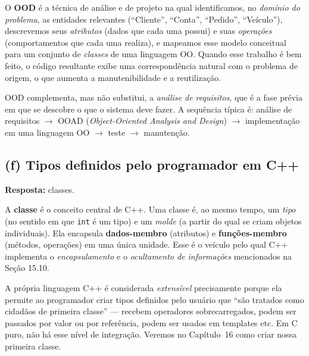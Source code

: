 \documentclass[11pt,a4paper]{article}
\begin{document}
O \textbf{OOD} \'e a t\'ecnica de an\'alise e de projeto na qual identificamos, no \emph{dom\'inio do problema}, as entidades relevantes (``Cliente'', ``Conta'', ``Pedido'', ``Ve\'iculo''), descrevemos seus \emph{atributos} (dados que cada uma possui) e suas \emph{opera\c{c}\~oes} (comportamentos que cada uma realiza), e mapeamos esse modelo conceitual para um conjunto de \emph{classes} de uma linguagem OO. Quando esse trabalho \'e bem feito, o c\'odigo resultante exibe uma correspond\^encia natural com o problema de origem, o que aumenta a manutenibilidade e a reutiliza\c{c}\~ao.

\begin{obseng}
OOD complementa, mas n\~ao substitui, a \emph{an\'alise de requisitos}, que \'e a fase pr\'evia em que se descobre o que o sistema deve fazer. A sequ\^encia t\'ipica \'e: an\'alise de requisitos $\rightarrow$ OOAD (\emph{Object-Oriented Analysis and Design}) $\rightarrow$ implementa\c{c}\~ao em uma linguagem OO $\rightarrow$ teste $\rightarrow$ manuten\c{c}\~ao.
\end{obseng}

\subsection*{(f) Tipos definidos pelo programador em C++}

\begin{resposta}\textbf{Resposta:} classes.\end{resposta}

A \textbf{classe} \'e o conceito central de C++. Uma classe \'e, ao mesmo tempo, um \emph{tipo} (no sentido em que \texttt{int} \'e um tipo) e um \emph{molde} (a partir do qual se criam objetos individuais). Ela encapsula \textbf{dados-membro} (atributos) e \textbf{fun\c{c}\~oes-membro} (m\'etodos, opera\c{c}\~oes) em uma \'unica unidade. Esse \'e o ve\'iculo pelo qual C++ implementa o \emph{encapsulamento} e o \emph{ocultamento de informa\c{c}\~oes} mencionados na Se\c{c}\~ao 15.10.

\begin{obseng}
A pr\'opria linguagem C++ \'e considerada \emph{extens\'ivel} precisamente porque ela permite ao programador criar tipos definidos pelo usu\'ario que ``s\~ao tratados como cidad\~aos de primeira classe'' --- recebem operadores sobrecarregados, podem ser passados por valor ou por refer\^encia, podem ser usados em templates etc. Em C puro, n\~ao h\'a esse n\'ivel de integra\c{c}\~ao. Veremos no Cap\'itulo~16 como criar nossa primeira classe.
\end{obseng}
\end{document}
